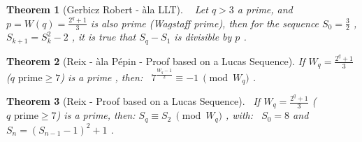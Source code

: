 \documentclass[latin1]{quadrature}
\newcommand{\PMod}[1]{\!\!\pmod{#1}}
\newtheorem{theorem}{Theorem}
\newif\ifenfrancais
\begin{document}
\begin{article}
\begin{article}
\ifenfrancais
\begin{theorem}[Gerbicz Robert - \`ala LLT]
\ 
\newline
Soit $q \geqslant 5$ premier, et soit $p=W(q)= \frac{2^q+1}{3}$ un nombre premier (de Wagstaff),
alors, avec la s\'equence $S_0=\frac{3}{2}$ , $S_{k+1} = S_{k}^2 - 2$ , $S_q - S_1$ est divisible par $p$ .
\end{theorem}
\else
\begin{theorem}[Gerbicz Robert - \`ala LLT]
\ 
\newline
Let $q > 3$ a prime, and $p=W(q)= \frac{2^q+1}{3}$ is also prime (Wagstaff prime),
then for the sequence $S_0=\frac{3}{2}$ , $S_{k+1} = S_{k}^2 - 2$ , it is true that $S_q - S_1$ is divisible by $p$ .
\end{theorem}
\fi

\vspace{-.1in}

\ifenfrancais
\begin{theorem}[Reix - \`ala P\'epin - Preuve bas\'ee sur une S\'equence de Lucas]

Si $W_q = \frac{2^{\scriptstyle q}+1}{3}$ ($q \text{ premier} \geqslant 7$) est premier , alors on a :
 \ $7^{\frac{W_q-1}{2}} \equiv -1 \ \PMod{W_q}$ .
 \end{theorem}
\else
\begin{theorem}[Reix - \`ala P\'epin - Proof based on a Lucas Sequence]

If $W_q = \frac{2^{\scriptstyle q}+1}{3}$ ($q \text{ prime} \geqslant 7$) is a prime , then:
 \ $7^{\frac{W_q-1}{2}} \equiv -1 \ \PMod{W_q}$ .
\end{theorem}
\fi

\vspace{-.1in}

\ifenfrancais
\begin{theorem}[Reix - Preuve bas\'ee sur une S\'equence de Lucas - Cycle du DiGraph]
\ 
\newline
Si $W_q =\frac{2^{\scriptstyle q}+1}{3}$ ($q \text{ premier } \geqslant 7$) est premier, alors :
$S_{q} \equiv S_2 \ \PMod{W_q}$ ,
avec : \ $S_0 = 8$ et $S_n = (S_{n-1}-1)^2+1$ .
\end{theorem}
\else
\begin{theorem}[Reix - Proof based on a Lucas Sequence]
\ 
If $W_q =\frac{2^{\scriptstyle q}+1}{3}$ ($q \text{ prime} \geqslant 7$) is a prime, then:
$S_{q} \equiv S_2 \ \PMod{W_q}$ ,
with: \ $S_0 = 8$ and $S_n = (S_{n-1}-1)^2+1$ .
\end{theorem}
\fi


\end{article}
\end{article}
\end{document}
